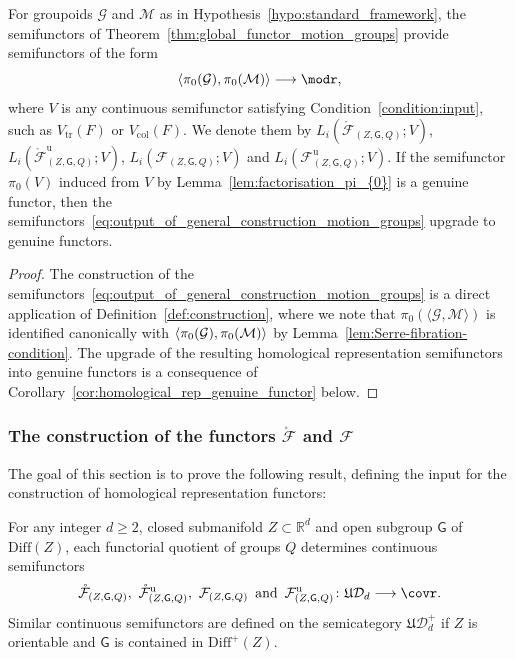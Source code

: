 \documentclass[AHL,Unicode,published]{cedram}
\newcommand{\Diff}{\mathrm{Diff}}
\newcommand{\Int}{\mathring}
\newcommand{\triv}{\mathrm{tr}}
\newcommand{\col}{\mathrm{col}}
\newcommand{\unt}{\mathrm{u}}
\newcommand{\fU}{\ensuremath{\mathfrak{U}}}
\newcommand{\sG}{\mathsf{G}}
\newcommand{\cD}{\mathcal{D}}
\newcommand{\cF}{\mathcal{F}}
\newcommand{\cG}{\mathcal{G}}
\newcommand{\cM}{\mathcal{M}}
\newcommand{\bR}{\mathbb{R}}
\newcommand{\too}{\ensuremath{\longrightarrow}}
\renewcommand{\geq}{\geqslant}
\begin{document}
\begin{coro}\label{coro:def_homological_rep_functor_motion_groups}
For groupoids $\cG$ and $\cM$ as in Hypothesis~\ref{hypo:standard_framework}, the semifunctors of Theorem~\ref{thm:global_functor_motion_groups} provide semifunctors of the form
\begin{equation}\label{eq:output_of_general_construction_motion_groups}
\langle \pi_{0}(\cG), \pi_{0}(\cM) \rangle \too \modr,
\end{equation}
where $V$ is any continuous semifunctor satisfying Condition~\ref{condition:input}, such as $V_{\triv}(F)$ or $V_{\col}(F)$. We denote them by $L_{i}(\Int{\cF}_{(Z,\sG,Q)};V)$, $L_{i}(\Int{\cF}^{\unt}_{(Z,\sG,Q)};V)$, $L_{i}(\cF_{(Z,\sG,Q)};V)$ and $L_{i}(\cF^{\unt}_{(Z,\sG,Q)};V)$. If the semifunctor $\pi_{0}(V)$ induced from $V$ by Lemma~\ref{lem:factorisation_pi_{0}} is a genuine functor, then the semifunctors~\eqref{eq:output_of_general_construction_motion_groups} upgrade to genuine functors.
\end{coro}

\begin{proof}
The construction of the semifunctors~\eqref{eq:output_of_general_construction_motion_groups} is a direct application of Definition~\ref{def:construction}, where we note that $\pi_{0}(\langle \cG, \cM \rangle)$ is identified canonically with $\langle \pi_{0}(\cG),\linebreak \pi_{0}(\cM) \rangle$ by Lemma~\ref{lem:Serre-fibration-condition}. The upgrade of the resulting homological representation semifunctors into genuine functors is a consequence of Corollary~\ref{cor:homological_rep_genuine_functor} below.
\end{proof}


\subsubsection{The construction of the functors \texorpdfstring{$\Int{\cF}$}{F} and \texorpdfstring{$\cF$}{F}}\label{sss:F-construction}

The goal of this section is to prove the following result, defining the input for the construction of homological representation functors:

\begin{theo}\label{thm:global_functor_motion_groups}
For any integer $d \geq 2$, closed submanifold $Z \subset \bR^d$ and open subgroup $\sG$ of $\Diff(Z)$, each functorial quotient of groups $Q$ determines continuous semifunctors
\begin{equation}\label{eq:global-functor2}
\Int{\cF}_{(Z,\sG,Q)},\,\,\Int{\cF}^{\unt}_{(Z,\sG,Q)},\,\,\cF_{(Z,\sG,Q)}\, \text{ and }\, \cF^{\unt}_{(Z,\sG,Q)} \colon \fU\cD_{d} \too \covr.
\end{equation}
Similar continuous semifunctors are defined on the semicategory $\fU\cD_{d}^{+}$ if $Z$ is orientable and $\sG$ is contained in $\Diff^{+}(Z)$.
\end{theo}
\end{document}
